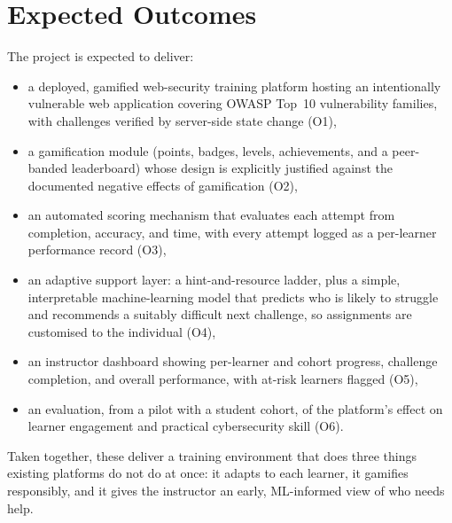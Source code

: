 \section{Expected Outcomes}

The project is expected to deliver:

\begin{itemize}[leftmargin=1.4em,itemsep=0.25em]
\item a deployed, gamified web-security training platform hosting an intentionally
      vulnerable web application covering OWASP Top~10 vulnerability
      families, with challenges verified by server-side state change (O1),
\item a gamification module (points, badges, levels, achievements, and a
      peer-banded leaderboard) whose design is explicitly justified against the
      documented negative effects of gamification (O2),
\item an automated scoring mechanism that evaluates each attempt from completion,
      accuracy, and time, with every attempt logged as a per-learner performance
      record (O3),
\item an adaptive support layer: a hint-and-resource ladder, plus a simple,
      interpretable machine-learning model that predicts who is likely to struggle
      and recommends a suitably difficult next challenge, so assignments are
      customised to the individual (O4),
\item an instructor dashboard showing per-learner and cohort progress, challenge
      completion, and overall performance, with at-risk learners flagged (O5),
\item an evaluation, from a pilot with a student cohort, of the platform's effect on
      learner engagement and practical cybersecurity skill (O6).
\end{itemize}

\noindent
Taken together, these deliver a training environment that does three things existing
platforms do not do at once: it adapts to each learner, it gamifies responsibly, and
it gives the instructor an early, ML-informed view of who needs help.
